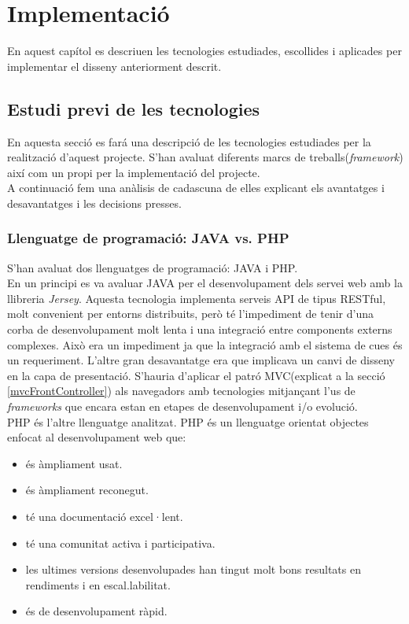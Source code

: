\chapter{Implementaci\'{o}}
\label{cha:implementation}
En aquest capítol es descriuen les tecnologies estudiades, escollides i aplicades per implementar el disseny anteriorment descrit.\\


\section{Estudi previ de les tecnologies}
En aquesta secci\'{o} es far\'{a} una descripci\'{o} de les tecnologies estudiades per la realització d'aquest projecte. S'han avaluat diferents marcs de treballs(\textit{framework}) així com un propi per la implementació del projecte.\\

A continuació fem una anàlisis de cadascuna de elles explicant els avantatges i desavantatges i les decisions presses.

\subsection{Llenguatge de programació: JAVA vs. PHP}
S'han avaluat dos llenguatges de programació: JAVA i PHP.\\

En un principi es va avaluar JAVA per el desenvolupament dels servei web amb la llibreria \textit{Jersey}.\cite{jersey} Aquesta tecnologia implementa serveis API de tipus RESTful, molt convenient per entorns distribuits, però t\'{e} l'impediment de tenir d'una corba de desenvolupament molt lenta i una integració entre components externs complexes. Això era un impediment ja que la integració amb el sistema de cues \'{e}s un requeriment. L'altre gran desavantatge era que implicava un canvi de disseny en la capa de presentació. S'hauria d'aplicar el patró MVC(explicat a la secció \ref{mvcFrontController}) als navegadors amb tecnologies mitjançant l'us de \textit{frameworks} que encara estan en etapes de desenvolupament i/o evolució.\\

PHP \'{e}s l'altre llenguatge analitzat. PHP \'{e}s un llenguatge orientat objectes enfocat al desenvolupament web que:
\begin{itemize}
\item \'{e}s àmpliament usat.
\item \'{e}s àmpliament reconegut.
\item t\'{e} una documentació excel·lent.
\item t\'{e} una comunitat activa i participativa.
\item les ultimes versions desenvolupades han tingut molt bons resultats en rendiments i en escal.labilitat.
\item \'{e}s de desenvolupament ràpid.
\end{itemize}

